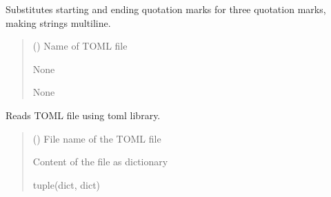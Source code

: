 \documentclass[letterpaper,10pt,english]{sphinxmanual}
\begin{document}
\begin{fulllineitems}
\label{\detokenize{toml_report_utils:toml_report_utils.postprocess_report}}
\pysigstartsignatures
\pysiglinewithargsret
{}
{}
{}
\pysigstopsignatures
\sphinxAtStartPar
Substitutes starting and ending quotation marks for three quotation marks, making strings multiline.
\begin{quote}\begin{description}
\sphinxAtStartPar
{} () \textendash{} Name of TOML file

\sphinxAtStartPar
None

\sphinxAtStartPar
None

\end{description}\end{quote}

\end{fulllineitems}


\begin{fulllineitems}
\label{\detokenize{toml_report_utils:toml_report_utils.read_report}}
\pysigstartsignatures
\pysiglinewithargsret
{}
{}
{}
\pysigstopsignatures
\sphinxAtStartPar
Reads TOML file using toml library.
\begin{quote}\begin{description}
\sphinxAtStartPar
{} () \textendash{} File name of the TOML file

\sphinxAtStartPar
Content of the file as dictionary

\sphinxAtStartPar
tuple(dict, dict)

\end{description}\end{quote}

\end{fulllineitems}
\end{document}
